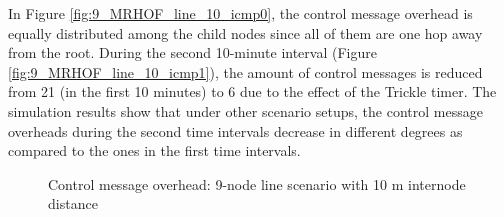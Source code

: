 In Figure \ref{fig:9_MRHOF_line_10_icmp0}, the control message overhead is equally distributed among the child nodes since all of them are one hop away from the root. During the second 10-minute interval (Figure \ref{fig:9_MRHOF_line_10_icmp1}), the amount of control messages is reduced from 21 (in the first 10 minutes) to 6 due to the effect of the Trickle timer. The simulation results show that under other scenario setups, the control message overheads during the second time intervals decrease in different degrees as compared to the ones in the first time intervals.

\begin{figure}[p]
  \begin{center}
    \leavevmode
    \caption{Control message overhead: 9-node line scenario with 10 m internode distance}
    \label{fig:9_MRHOF_line_10_icmp}
  \end{center}
   \vspace{-20pt}
\end{figure}

